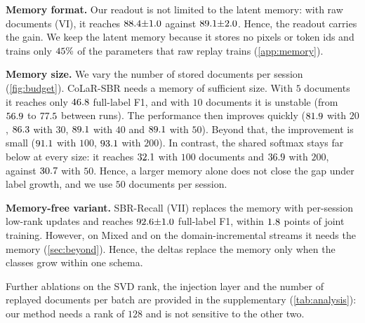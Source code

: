 \documentclass[10pt,twocolumn,letterpaper]{article}
\newcommand{\runin}[1]{\par\addvspace{0.7ex plus .3ex minus .1ex}\noindent\textbf{#1}\hspace{1em}\ignorespaces}
\begin{document}
\runin{Memory format.}\label{sec:cost} Our readout is not limited to the latent memory: with raw documents (VI), it reaches $88.4{\pm}1.0$ against $89.1{\pm}2.0$. Hence, the readout carries the gain. We keep the latent memory because it stores no pixels or token ids and trains only $45\%$ of the parameters that raw replay trains (\cref{app:memory}).

\runin{Memory size.} We vary the number of stored documents per session (\cref{fig:budget}). CoLaR-SBR needs a memory of sufficient size. With $5$ documents it reaches only $46.8$ full-label F1, and with $10$ documents it is unstable (from $56.9$ to $77.5$ between runs). The performance then improves quickly ($81.9$ with $20$, $86.3$ with $30$, $89.1$ with $40$ and $89.1$ with $50$). Beyond that, the improvement is small ($91.1$ with $100$, $93.1$ with $200$). In contrast, the shared softmax stays far below at every size: it reaches $32.1$ with $100$ documents and $36.9$ with $200$, against $30.7$ with $50$. Hence, a larger memory alone does not close the gap under label growth, and we use $50$ documents per session.

\runin{Memory-free variant.} SBR-Recall (VII) replaces the memory with per-session low-rank updates and reaches $92.6{\pm}1.0$ full-label F1, within $1.8$ points of joint training. However, on Mixed and on the domain-incremental streams it needs the memory (\cref{sec:beyond}). Hence, the deltas replace the memory only when the classes grow within one schema.

Further ablations on the SVD rank, the injection layer and the number of replayed documents per batch are provided in the supplementary (\cref{tab:analysis}): our method needs a rank of $128$ and is not sensitive to the other two.
\end{document}
